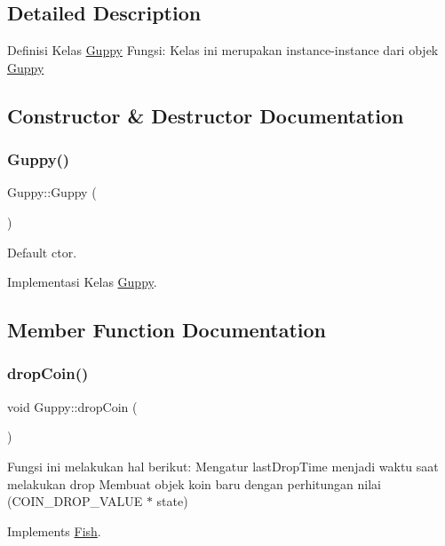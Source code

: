 \subsection{Detailed Description}
Definisi Kelas \mbox{\hyperlink{class_guppy}{Guppy}} Fungsi\+: Kelas ini merupakan instance-\/instance dari objek \mbox{\hyperlink{class_guppy}{Guppy}} 

\subsection{Constructor \& Destructor Documentation}
\mbox{\label{class_guppy_aa78f8b5323b1015c968a8edab52773f5}} 
\subsubsection{\texorpdfstring{Guppy()}{Guppy()}}
{\footnotesize\ttfamily Guppy\+::\+Guppy (\begin{DoxyParamCaption}{ }\end{DoxyParamCaption})}



Default ctor. 

Implementasi Kelas \mbox{\hyperlink{class_guppy}{Guppy}}. 

\subsection{Member Function Documentation}
\mbox{\label{class_guppy_a356d1f45f52684bba3e6e9e7774e59b8}} 
\subsubsection{\texorpdfstring{drop\+Coin()}{dropCoin()}}
{\footnotesize\ttfamily void Guppy\+::drop\+Coin (\begin{DoxyParamCaption}{ }\end{DoxyParamCaption})\hspace{0.3cm}{\ttfamily [virtual]}}

Fungsi ini melakukan hal berikut\+: Mengatur last\+Drop\+Time menjadi waktu saat melakukan drop Membuat objek koin baru dengan perhitungan nilai (C\+O\+I\+N\+\_\+\+D\+R\+O\+P\+\_\+\+V\+A\+L\+UE $\ast$ state) 

Implements \mbox{\hyperlink{class_fish}{Fish}}.

